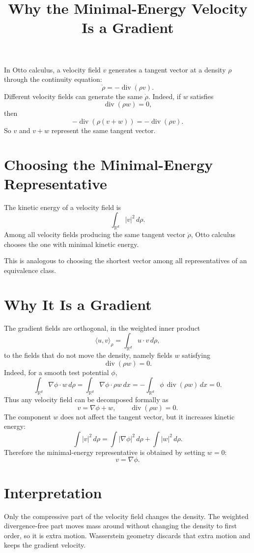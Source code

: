 \documentclass[11pt]{article}
\title{Why the Minimal-Energy Velocity Is a Gradient}
\author{}
\date{}
\begin{document}
\maketitle

In Otto calculus, a velocity field $v$ generates a tangent vector at a density
$\rho$ through the continuity equation:
\[
\dot\rho=-\operatorname{div}(\rho v).
\]
Different velocity fields can generate the same $\dot\rho$. Indeed, if $w$
satisfies
\[
\operatorname{div}(\rho w)=0,
\]
then
\[
-\operatorname{div}(\rho(v+w))
=
-\operatorname{div}(\rho v).
\]
So $v$ and $v+w$ represent the same tangent vector.

\section*{Choosing the Minimal-Energy Representative}

The kinetic energy of a velocity field is
\[
\int_{\mathbb R^d}|v|^2\,d\rho.
\]
Among all velocity fields producing the same tangent vector $\dot\rho$, Otto
calculus chooses the one with minimal kinetic energy.

This is analogous to choosing the shortest vector among all representatives of
an equivalence class.

\section*{Why It Is a Gradient}

The gradient fields are orthogonal, in the weighted inner product
\[
\langle u,v\rangle_\rho
=
\int_{\mathbb R^d} u\cdot v\,d\rho,
\]
to the fields that do not move the density, namely fields $w$ satisfying
\[
\operatorname{div}(\rho w)=0.
\]
Indeed, for a smooth test potential $\phi$,
\[
\int_{\mathbb R^d} \nabla\phi\cdot w\,d\rho
=
\int_{\mathbb R^d} \nabla\phi\cdot \rho w\,dx
=
-\int_{\mathbb R^d}\phi\,\operatorname{div}(\rho w)\,dx
=0.
\]
Thus any velocity field can be decomposed formally as
\[
v=\nabla\phi+w,
\qquad
\operatorname{div}(\rho w)=0.
\]
The component $w$ does not affect the tangent vector, but it increases kinetic
energy:
\[
\int |v|^2\,d\rho
=
\int |\nabla\phi|^2\,d\rho
+
\int |w|^2\,d\rho.
\]
Therefore the minimal-energy representative is obtained by setting $w=0$:
\[
v=\nabla\phi.
\]

\section*{Interpretation}

Only the compressive part of the velocity field changes the density. The
weighted divergence-free part moves mass around without changing the density to
first order, so it is extra motion. Wasserstein geometry discards that extra
motion and keeps the gradient velocity.
\end{document}
